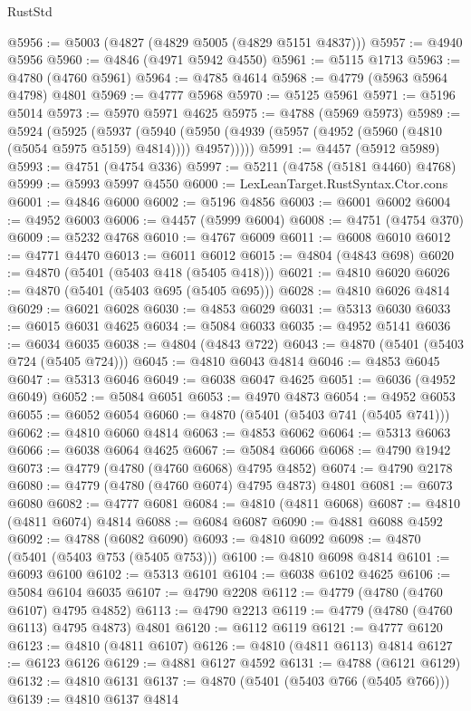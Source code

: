 \begin{lexlean}{RustStd}
\begin{coremodule}
@5956 := @5003 (@4827 (@4829 @5005 (@4829 @5151 @4837)))
@5957 := @4940 @5956
@5960 := @4846 (@4971 @5942 @4550)
@5961 := @5115 @1713
@5963 := @4780 (@4760 @5961)
@5964 := @4785 @4614
@5968 := @4779 (@5963 @5964 @4798) @4801
@5969 := @4777 @5968
@5970 := @5125 @5961
@5971 := @5196 @5014
@5973 := @5970 @5971 @4625
@5975 := @4788 (@5969 @5973)
@5989 := @5924
    (@5925
      (@5937
        (@5940 (@5950 (@4939 (@5957 (@4952 (@5960 (@4810 (@5054 @5975 @5159) @4814)))) @4957)))))
@5991 := @4457 (@5912 @5989)
@5993 := @4751 (@4754 @336)
@5997 := @5211 (@4758 (@5181 @4460) @4768)
@5999 := @5993 @5997 @4550
@6000 := LexLeanTarget.RustSyntax.Ctor.cons
@6001 := @4846 @6000
@6002 := @5196 @4856
@6003 := @6001 @6002
@6004 := @4952 @6003
@6006 := @4457 (@5999 @6004)
@6008 := @4751 (@4754 @370)
@6009 := @5232 @4768
@6010 := @4767 @6009
@6011 := @6008 @6010
@6012 := @4771 @4470
@6013 := @6011 @6012
@6015 := @4804 (@4843 @698)
@6020 := @4870 (@5401 (@5403 @418 (@5405 @418)))
@6021 := @4810 @6020
@6026 := @4870 (@5401 (@5403 @695 (@5405 @695)))
@6028 := @4810 @6026 @4814
@6029 := @6021 @6028
@6030 := @4853 @6029
@6031 := @5313 @6030
@6033 := @6015 @6031 @4625
@6034 := @5084 @6033
@6035 := @4952 @5141
@6036 := @6034 @6035
@6038 := @4804 (@4843 @722)
@6043 := @4870 (@5401 (@5403 @724 (@5405 @724)))
@6045 := @4810 @6043 @4814
@6046 := @4853 @6045
@6047 := @5313 @6046
@6049 := @6038 @6047 @4625
@6051 := @6036 (@4952 @6049)
@6052 := @5084 @6051
@6053 := @4970 @4873
@6054 := @4952 @6053
@6055 := @6052 @6054
@6060 := @4870 (@5401 (@5403 @741 (@5405 @741)))
@6062 := @4810 @6060 @4814
@6063 := @4853 @6062
@6064 := @5313 @6063
@6066 := @6038 @6064 @4625
@6067 := @5084 @6066
@6068 := @4790 @1942
@6073 := @4779 (@4780 (@4760 @6068) @4795 @4852)
@6074 := @4790 @2178
@6080 := @4779 (@4780 (@4760 @6074) @4795 @4873) @4801
@6081 := @6073 @6080
@6082 := @4777 @6081
@6084 := @4810 (@4811 @6068)
@6087 := @4810 (@4811 @6074) @4814
@6088 := @6084 @6087
@6090 := @4881 @6088 @4592
@6092 := @4788 (@6082 @6090)
@6093 := @4810 @6092
@6098 := @4870 (@5401 (@5403 @753 (@5405 @753)))
@6100 := @4810 @6098 @4814
@6101 := @6093 @6100
@6102 := @5313 @6101
@6104 := @6038 @6102 @4625
@6106 := @5084 @6104 @6035
@6107 := @4790 @2208
@6112 := @4779 (@4780 (@4760 @6107) @4795 @4852)
@6113 := @4790 @2213
@6119 := @4779 (@4780 (@4760 @6113) @4795 @4873) @4801
@6120 := @6112 @6119
@6121 := @4777 @6120
@6123 := @4810 (@4811 @6107)
@6126 := @4810 (@4811 @6113) @4814
@6127 := @6123 @6126
@6129 := @4881 @6127 @4592
@6131 := @4788 (@6121 @6129)
@6132 := @4810 @6131
@6137 := @4870 (@5401 (@5403 @766 (@5405 @766)))
@6139 := @4810 @6137 @4814

\end{coremodule}
\end{lexlean}
